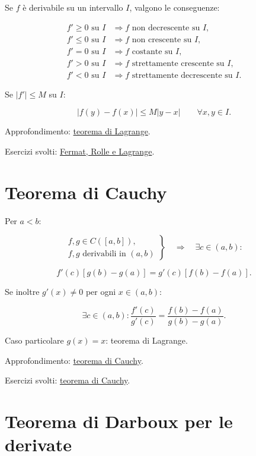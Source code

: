 Se \(f\) è derivabile su un intervallo \(I\), valgono le conseguenze:

\[
\begin{aligned}
f'\ge0\text{ su }I&\Longrightarrow f\text{ non decrescente su }I,\\
f'\le0\text{ su }I&\Longrightarrow f\text{ non crescente su }I,\\
f'=0\text{ su }I&\Longrightarrow f\text{ costante su }I,\\
f'>0\text{ su }I&\Longrightarrow f\text{ strettamente crescente su }I,\\
f'<0\text{ su }I&\Longrightarrow f\text{ strettamente decrescente su }I.
\end{aligned}
\]

Se \(|f'|\le M\) su \(I\):

\[
\displaystyle
|f(y)-f(x)|\le M|y-x|
\qquad\forall x,y\in I.
\]

Approfondimento: \href{https://ingegnerismo.it/matematica/teorema-di-lagrange/}{teorema di Lagrange}.

Esercizi svolti: \href{https://ingegnerismo.it/matematica/fermat-rolle-lagrange-esercizi/}{Fermat, Rolle e Lagrange}.

\section{Teorema di Cauchy}\label{teorema-di-cauchy}

Per \(a<b\):

\[
\displaystyle
\left.
\begin{array}{l}
f,g\in C([a,b]),\\
f,g\text{ derivabili in }(a,b)
\end{array}
\right\}
\quad\Longrightarrow\quad
\exists c\in(a,b):
\]

\[
\displaystyle
f'(c)[g(b)-g(a)]
=
g'(c)[f(b)-f(a)].
\]

Se inoltre \(g'(x)\ne0\) per ogni \(x\in(a,b)\):

\[
\displaystyle
\exists c\in(a,b):
\frac{f'(c)}{g'(c)}
=
\frac{f(b)-f(a)}{g(b)-g(a)}.
\]

Caso particolare \(g(x)=x\): teorema di Lagrange.

Approfondimento: \href{https://ingegnerismo.it/matematica/teorema-di-cauchy/}{teorema di Cauchy}.

Esercizi svolti: \href{https://ingegnerismo.it/matematica/teoremi-calcolo-differenziale-esercizi/}{teorema di Cauchy}.

\section{Teorema di Darboux per le derivate}\label{teorema-di-darboux-per-le-derivate}

